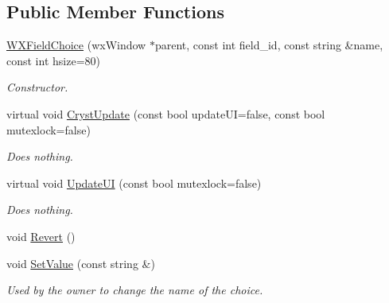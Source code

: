 \subsection*{Public Member Functions}
\begin{DoxyCompactItemize}
\item 
\mbox{\label{class_obj_cryst_1_1_w_x_field_choice_a1f2515335651539ee3a9b2cfc331f447}} 
\mbox{\hyperlink{class_obj_cryst_1_1_w_x_field_choice_a1f2515335651539ee3a9b2cfc331f447}{W\+X\+Field\+Choice}} (wx\+Window $\ast$parent, const int field\+\_\+id, const string \&name, const int hsize=80)
\begin{DoxyCompactList}\small\item\em Constructor. \end{DoxyCompactList}\item 
\mbox{\label{class_obj_cryst_1_1_w_x_field_choice_a7067a77708a8d1447e329e7d27e98e3d}} 
virtual void \mbox{\hyperlink{class_obj_cryst_1_1_w_x_field_choice_a7067a77708a8d1447e329e7d27e98e3d}{Cryst\+Update}} (const bool update\+UI=false, const bool mutexlock=false)
\begin{DoxyCompactList}\small\item\em Does nothing. \end{DoxyCompactList}\item 
\mbox{\label{class_obj_cryst_1_1_w_x_field_choice_aa5e1eb75e0131d4bc55de4f4861d7a85}} 
virtual void \mbox{\hyperlink{class_obj_cryst_1_1_w_x_field_choice_aa5e1eb75e0131d4bc55de4f4861d7a85}{Update\+UI}} (const bool mutexlock=false)
\begin{DoxyCompactList}\small\item\em Does nothing. \end{DoxyCompactList}\item 
void \mbox{\hyperlink{class_obj_cryst_1_1_w_x_field_choice_a3b923575bb9d616bd9c80a7929d0a388}{Revert}} ()
\item 
\mbox{\label{class_obj_cryst_1_1_w_x_field_choice_aae6b6916aaa6881c36aa543a05c68726}} 
void \mbox{\hyperlink{class_obj_cryst_1_1_w_x_field_choice_aae6b6916aaa6881c36aa543a05c68726}{Set\+Value}} (const string \&)
\begin{DoxyCompactList}\small\item\em Used by the owner to change the name of the choice. \end{DoxyCompactList}\item 

\end{DoxyCompactItemize}
